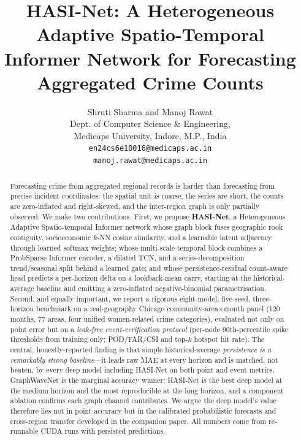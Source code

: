 \documentclass[11pt,conference]{IEEEtran}
\begin{document}
\title{HASI-Net: A Heterogeneous Adaptive Spatio-Temporal Informer Network
for Forecasting Aggregated Crime Counts}
\author{Shruti Sharma and Manoj Rawat \\
Dept. of Computer Science \& Engineering,\\
Medicaps University, Indore, M.P., India \\
\texttt{en24cs6e10016@medicaps.ac.in} \\
\texttt{manoj.rawat@medicaps.ac.in}}
\maketitle

\begin{abstract}
Forecasting crime from aggregated regional records is harder than forecasting
from precise incident coordinates: the spatial unit is coarse, the series are
short, the counts are zero-inflated and right-skewed, and the inter-region
graph is only partially observed. We make two contributions. First, we propose
\textbf{HASI-Net}, a Heterogeneous Adaptive Spatio-temporal Informer network
whose graph block fuses geographic rook contiguity, socioeconomic $k$-NN
cosine similarity, and a learnable latent adjacency through learned softmax
weights; whose multi-scale temporal block combines a ProbSparse Informer
encoder, a dilated TCN, and a series-decomposition trend/seasonal split behind
a learned gate; and whose persistence-residual count-aware head predicts a
per-horizon delta on a lookback-mean carry, starting at the historical-average
baseline and emitting a zero-inflated negative-binomial parametrisation.
Second, and equally important, we report a rigorous eight-model,
five-seed, three-horizon benchmark on a real-geography Chicago
community-area$\times$month panel (120 months, 77 areas, four unified
women-related crime categories), evaluated not only on point error but on a
\emph{leak-free event-verification protocol} (per-node 90th-percentile spike
thresholds from training only; POD/FAR/CSI and top-$k$ hotspot hit rate). The
central, honestly-reported finding is that simple historical-average
\emph{persistence is a remarkably strong baseline}---it leads raw MAE at every
horizon and is matched, not beaten, by every deep model including HASI-Net on
both point and event metrics. GraphWaveNet is the marginal accuracy winner;
HASI-Net is the best deep model at the medium horizon and the most
reproducible at the long horizon, and a component ablation confirms each graph
channel contributes. We argue the deep model's value therefore lies not in
point accuracy but in the calibrated probabilistic forecasts and cross-region
transfer developed in the companion paper. All numbers come from re-runnable
CUDA runs with persisted predictions.
\end{abstract}
\end{document}
